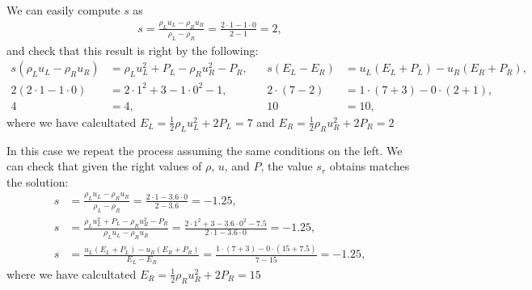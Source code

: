 \begin{questions}

\begin{solution}
We can easily compute $s$ as
\begin{align*}
s=\frac{\rho_Lu_L-\rho_Ru_R}{\rho_L-\rho_R}=\frac{2\cdot 1-1\cdot 0}{2-1}=2,
\end{align*}
and check that this result is right by the following:
\begin{align*}
s\left(\rho_Lu_L-\rho_Ru_R\right)&=\rho_Lu_L^2+P_L-\rho_Ru_R^2-P_R, ~~&~~ s\left(E_L-E_R\right)&=u_L(E_L+P_L)-u_R(E_R+P_R),\\
2\left(2\cdot 1-1\cdot 0\right)&=2\cdot 1^2+3-1\cdot 0^2-1, ~~&~~ 2\cdot(7-2)&=1\cdot(7+3)-0\cdot(2+1),\\
4&=4, ~~&~~ 10&=10,
\end{align*}
where we have calcultated $E_L=\frac{1}{2}\rho_Lu_L^2+2P_L=7$ and $E_R=\frac{1}{2}\rho_Ru_R^2+2P_R=2$
\end{solution}
\begin{solution}
In this case we repeat the process assuming the same conditions on the left. We can check that given the right values of $\rho$, $u$, and $P$, the value $s_r$ obtains matches the solution:
\begin{align*}
s&=\frac{\rho_Lu_L-\rho_Ru_R}{\rho_L-\rho_R}=\frac{2\cdot 1-3.6\cdot 0}{2-3.6}=-1.25,\\
s&=\frac{\rho_Lu_L^2+P_L-\rho_Ru_R^2-P_R}{\rho_Lu_L-\rho_Ru_R}=\frac{2\cdot 1^2+3-3.6\cdot 0^2-7.5}{2\cdot 1-3.6\cdot 0}=-1.25,\\
s&=\frac{u_L(E_L+P_L)-u_R(E_R+P_R)}{E_L-E_R}=\frac{1\cdot(7+3)-0\cdot(15+7.5)}{7-15}=-1.25,
\end{align*}
where we have calcultated $E_R=\frac{1}{2}\rho_Ru_R^2+2P_R=15$
\end{solution}
\end{questions}

